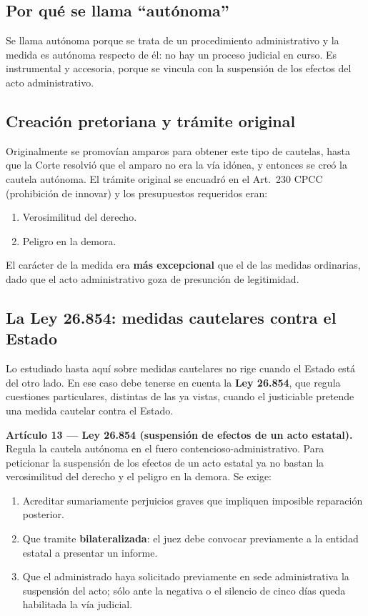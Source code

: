 \documentclass[12pt,oneside]{book}
\begin{document}
\subsection{Por qué se llama ``autónoma''}

Se llama autónoma porque se trata de un procedimiento administrativo y la medida es autónoma respecto de él: no hay un proceso judicial en curso. Es instrumental y accesoria, porque se vincula con la suspensión de los efectos del acto administrativo.

\subsection{Creación pretoriana y trámite original}

Originalmente se promovían amparos para obtener este tipo de cautelas, hasta que la Corte resolvió que el amparo no era la vía idónea, y entonces se creó la cautela autónoma. El trámite original se encuadró en el Art.~230 CPCC (prohibición de innovar) y los presupuestos requeridos eran:

\begin{enumerate}
    \item Verosimilitud del derecho.
    \item Peligro en la demora.
\end{enumerate}

El carácter de la medida era \textbf{más excepcional} que el de las medidas ordinarias, dado que el acto administrativo goza de presunción de legitimidad.

\subsection{La Ley 26.854: medidas cautelares contra el Estado}

Lo estudiado hasta aquí sobre medidas cautelares no rige cuando el Estado está del otro lado. En ese caso debe tenerse en cuenta la \textbf{Ley 26.854}, que regula cuestiones particulares, distintas de las ya vistas, cuando el justiciable pretende una medida cautelar contra el Estado.

\begin{important}
\textbf{Artículo 13 --- Ley 26.854 (suspensión de efectos de un acto estatal).} Regula la cautela autónoma en el fuero contencioso-administrativo. Para peticionar la suspensión de los efectos de un acto estatal ya no bastan la verosimilitud del derecho y el peligro en la demora. Se exige:
\begin{enumerate}
    \item Acreditar sumariamente perjuicios graves que impliquen imposible reparación posterior.
    \item Que tramite \textbf{bilateralizada}: el juez debe convocar previamente a la entidad estatal a presentar un informe.
    \item Que el administrado haya solicitado previamente en sede administrativa la suspensión del acto; sólo ante la negativa o el silencio de cinco días queda habilitada la vía judicial.
\end{enumerate}
\end{important}
\end{document}
